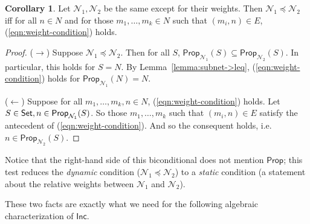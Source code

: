 \documentclass[letterpaper]{article}
\theoremstyle{definition}
\newtheorem{corollary}{Corollary}
\newcommand{\Set}{\mbox{\sf Set}}
\newcommand{\Prop}{\textsf{Prop}}
\newcommand{\Inc}{\textsf{Inc}}
\newcommand{\Net}{\mathcal{N}}
\begin{document}
\begin{corollary}
\label{corollary:subnet->weights}
Let $\Net_1, \Net_2$ be the same except for their weights.  Then $\Net_1 \preceq \Net_2$ iff for all $n \in N$ and for those $m_1, \ldots, m_k \in N$ such that $(m_i, n) \in E$, (\ref{eqn:weight-condition}) holds.
\end{corollary}
\begin{proof}
($\rightarrow$) Suppose $\Net_1 \preceq \Net_2$.  Then for all $S$, $\Prop_{\Net_1}(S) \subseteq \Prop_{\Net_2}(S)$.  In particular, this holds for $S = N$.  By Lemma~\ref{lemma:subnet->leq}, (\ref{eqn:weight-condition}) holds for $\Prop_{\Net_1}(N) = N$.

($\leftarrow$) Suppose for all $m_1, \ldots, m_k, n \in N$, (\ref{eqn:weight-condition}) holds.  Let $S \in \Set, n \in \Prop_{\Net_1}(S)$.  So those $m_1, \ldots, m_k$ such that $(m_i, n) \in E$ satisfy the antecedent of (\ref{eqn:weight-condition}).  And so the consequent holds, i.e. $n \in \Prop_{\Net_2}(S)$.
\end{proof}
Notice that the right-hand side of this biconditional does not mention $\Prop$; this test reduces the \emph{dynamic} condition ($\Net_1 \preceq \Net_2$) to a \emph{static} condition (a statement about the relative weights between $\Net_1$ and $\Net_2$).

These two facts are exactly what we need for the following algebraic characterization of $\Inc$.
\end{document}
